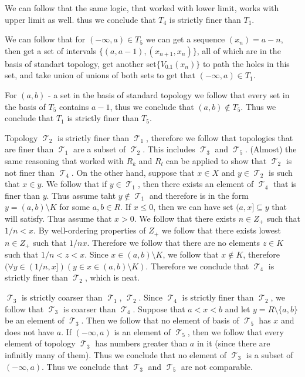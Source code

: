 \documentclass[11pt,oneside,titlepage]{book}
\DeclareMathOperator \topol {\mathcal {T}}
\newcommand{\set}[1]{\{ #1 \}}
\begin{document}
We can follow that the same logic, that worked with lower limit, works with upper limit as well.
thus we conclude that $T_4$ is strictly finer than $T_1$.

We can follow that for $(-\infty, a) \in T_5$ we can get a sequence $(x_n) = a - n$, then
get a set of intervals $\set{(a, a - 1), (x_{n + 1}, x_n)}$, all of which are in the basis of
standart topology, get another set$\set{V_{0.1}(x_n)}$ to path the holes in this set,
and take union of unions of both sets to get that $(-\infty, a) \in T_1$.

For $(a, b)$ - a set in the basis of standard topology we follow that every set in the
basis of $T_5$ contains $a - 1$, thus we conclude that $(a, b) \notin T_5$. Thus we
conclude that $T_1$ is strictly finer than $T_5$.

Topology $\topol_2$ is strictly finer than $\topol_1$, therefore we follow that
topologies that are finer than $\topol_1$ are a subset of $\topol_2$. This includes
$\topol_3$ and $\topol_5$. (Almost) the same reasoning that worked with $R_k$ and $R_l$
can be applied to show that $\topol_2$ is not finer than $\topol_4$. On the other hand,
suppose that $x \in X$ and $y \in \topol_2$ is such that $x \in y$. We follow that
if $y \in \topol_1$, then there exists an element of $\topol_4$ that is finer than
$y$. Thus assume taht $y \notin \topol_1$ and therefore is in the form
$y = (a, b) \setminus K$ for some $a, b \in R$. If $x \leq 0$, then we can have
set $(a, x] \subseteq y$ that will satisfy. Thus assume that $x > 0$. We follow that there
exists $n \in Z_+$ such that $1/n < x$. By well-ordering properties of $Z_+$ we
follow that there exists lowest $n \in Z_+$ such that $1/n  x$. Therefore we follow that
there are no elements $z \in K$ such that $1/n < z < x$. Since $x \in (a, b) \setminus K$,
we follow that $x \notin K$, therefore
$(\forall y \in (1/n, x])(y \in x \in (a, b) \setminus K)$. Therefore we conclude that
$\topol_4$ is strictly finer than $\topol_2$, which is neat.

$\topol_3$ is strictly coarser than $\topol_1$, $\topol_2$. Since $\topol_4$
is strictly finer than $\topol_2$, we follow that $\topol_3$ is coarser than $\topol_4$.
Suppose that $a < x < b$ and let $y = R \setminus \set{a, b}$ be an element of $\topol_3$.
Then we follow that no element of basis of $\topol_5$ has $x$ and does not have $a$.
If $(-\infty, a)$ is an element of $\topol_5$, then we follow that every element of topology
$\topol_3$ has numbers greater than $a$ in it (since there are infinitly  many of them).
Thus we conclude that no element of $\topol_3$ is a subset of $(-\infty, a)$. Thus we
conclude that $\topol_3$ and $\topol_5$ are not comparable.
\end{document}
